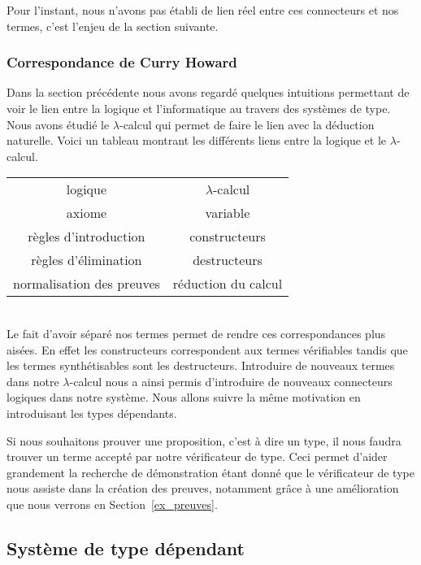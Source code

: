 \documentclass {article}
\theoremstyle{definition}
\theoremstyle{remark}
\begin{document}
Pour l'instant, nous n'avons pas établi de lien réel entre ces connecteurs et nos termes, c'est l'enjeu de la
section suivante.

\subsubsection{Correspondance de Curry Howard}
\label{corres_curry_howard}

Dans la section précédente nous avons regardé quelques intuitions permettant de voir le lien entre la logique
et l'informatique au travers des systèmes de type.
Nous avons étudié le $\lambda$-calcul qui permet de faire le lien avec la déduction naturelle. 
Voici un tableau montrant les différents liens entre la logique et le $\lambda$-calcul.

\begin{tabular}{c@{\quad$\leftrightarrow$\quad}c}
  logique & $\lambda$-calcul \\
  axiome & variable \\
  règles d'introduction & constructeurs \\
  règles d'élimination & destructeurs \\
  normalisation des preuves & réduction du calcul \\
\end{tabular}
\\


Le fait d'avoir séparé nos termes permet de rendre ces correspondances plus aisées. En effet les constructeurs
correspondent aux termes vérifiables tandis que les termes synthétisables sont les destructeurs.
Introduire de nouveaux termes dans notre $\lambda$-calcul nous a ainsi permis d'introduire de nouveaux connecteurs logiques dans notre système. Nous allons suivre la même motivation en introduisant les types dépendants.

Si nous souhaitons prouver une proposition, c'est à dire un type, il nous faudra trouver
un terme accepté par notre vérificateur de type.
Ceci permet d'aider grandement la recherche de démonstration étant donné que le vérificateur de type nous assiste dans la création des preuves, notamment grâce à une amélioration
que nous verrons en Section~\ref{ex_preuves}.



\subsection{Système de type dépendant}
\end{document}
